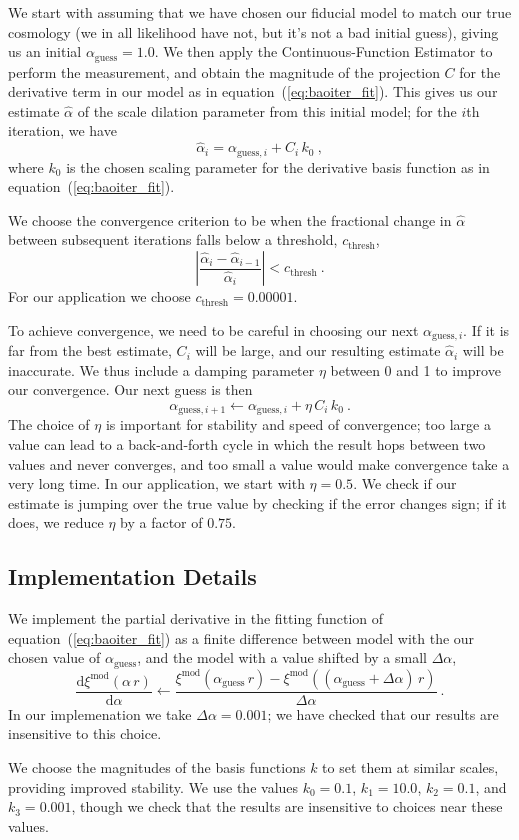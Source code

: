\documentclass[modern]{aastex62}
\newcommand{\est}{the Continuous-Function Estimator\xspace}
\newcommand{\eqt}[1]{equation~(\ref{#1})}
\newcommand{\dd}{\mathrm{d}}
\begin{document}
We start with assuming that we have chosen our fiducial model to match our true cosmology (we in all likelihood have not, but it's not a bad initial guess), giving us an initial $\alpha_\mathrm{guess} = 1.0$. 
We then apply \est to perform the measurement, and obtain the magnitude of the projection $C$ for the derivative term in our model as in \eqt{eq:baoiter_fit}. 
This gives us our estimate $\hat{\alpha}$ of the scale dilation parameter from this initial model; for the $i$th iteration, we have
\begin{equation}
    \hat{\alpha}_{i} = \alpha_{\mathrm{guess},i} + C_i \, k_0 ~,
\end{equation}
where $k_0$ is the chosen scaling parameter for the derivative basis function as in \eqt{eq:baoiter_fit}.

We choose the convergence criterion to be when the fractional change in $\hat{\alpha}$ between subsequent iterations falls below a threshold, $c_\mathrm{thresh}$,
\begin{equation}
    \left| \frac{\hat{\alpha}_i - \hat{\alpha}_{i-1}}{\hat{\alpha}_i} \right| < c_\mathrm{thresh} ~.
\end{equation}
For our application we choose $c_\mathrm{thresh} = 0.00001$.

To achieve convergence, we need to be careful in choosing our next $\alpha_{\mathrm{guess},i}$.
If it is far from the best estimate, $C_i$ will be large, and our resulting estimate $\hat{\alpha}_{i}$ will be inaccurate.
We thus include a damping parameter $\eta$ between 0 and 1 to improve our convergence.
Our next guess is then
\begin{equation}
    \alpha_{\mathrm{guess},i+1} \leftarrow \alpha_{\mathrm{guess},i} + \eta\,C_i\,k_0 ~.
\end{equation}
The choice of $\eta$ is important for stability and speed of convergence; too large a value can lead to a back-and-forth cycle in which the result hops between two values and never converges, and too small a value would make convergence take a very long time.
In our application, we start with $\eta=0.5$.
We check if our estimate is jumping over the true value by checking if the error changes sign; if it does, we reduce $\eta$ by a factor of $0.75$.

\subsection{Implementation Details}

We implement the partial derivative in the fitting function of \eqt{eq:baoiter_fit} as a finite difference between model with the our chosen value of $\alpha_\mathrm{guess}$, and the model with a value shifted by a small $\Delta \alpha$,
\begin{equation}
    \frac{\dd \xi^\mathrm{mod}(\alpha \, r)}{\dd \alpha} \leftarrow \frac{\xi^\mathrm{mod}(\alpha_\mathrm{guess} \, r) - \xi^\mathrm{mod}((\alpha_\mathrm{guess} + \Delta \alpha) \, r)}{\Delta \alpha} ~.
\end{equation}
In our implemenation we take $\Delta \alpha = 0.001$; we have checked that our results are insensitive to this choice.

We choose the magnitudes of the basis functions $k$ to set them at similar scales, providing improved stability.
We use the values $k_0=0.1$, $k_1=10.0$, $k_2=0.1$, and $k_3=0.001$, though we check that the results are insensitive to choices near these values.


\end{document}
